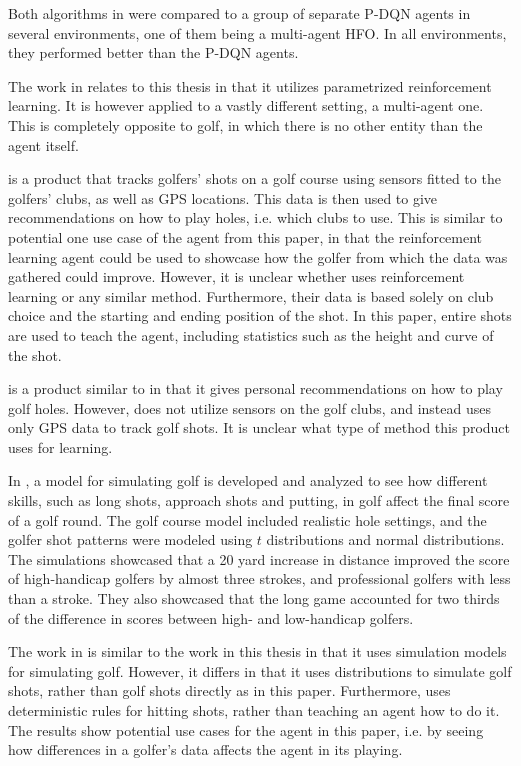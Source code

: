 \documentclass{kththesis}
\begin{document}
Both algorithms in \parencite{fu2019deep} were compared to a group of separate P-DQN agents in several environments, one of them being a multi-agent HFO. In all environments, they performed better than the P-DQN agents. 

The work in \parencite{fu2019deep} relates to this thesis in that it utilizes parametrized reinforcement learning. It is however applied to a vastly different setting, a multi-agent one. This is completely opposite to golf, in which there is no other entity than the agent itself.

\textcite{ArccosGo0:online} is a product that tracks golfers' shots on a golf course using sensors fitted to the golfers' clubs, as well as GPS locations. This data is then used to give recommendations on how to play holes, i.e. which clubs to use. This is similar to potential one use case of the agent from this paper, in that the reinforcement learning agent could be used to showcase how the golfer from which the data was gathered could improve. However, it is unclear whether \textcite{ArccosGo0:online} uses reinforcement learning or any similar method. Furthermore, their data is based solely on club choice and the starting and ending position of the shot. In this paper, entire shots are used to teach the agent, including statistics such as the height and curve of the shot.

\textcite{HelloBir63:online} is a product similar to \textcite{ArccosGo0:online} in that it gives personal recommendations on how to play golf holes. However, \textcite{HelloBir63:online} does not utilize sensors on the golf clubs, and instead uses only GPS data to track golf shots. It is unclear what type of method this product uses for learning.

In \parencite{ko2012simulation}, a model for simulating golf is developed and analyzed to see how different skills, such as long shots, approach shots and putting, in golf affect the final score of a golf round. The golf course model included realistic hole settings, and the golfer shot patterns were modeled using $t$ distributions and normal distributions. The simulations showcased that a 20 yard increase in distance improved the score of high-handicap golfers by almost three strokes, and professional golfers with less than a stroke. They also showcased that the long game accounted for two thirds of the difference in scores between high- and low-handicap golfers.

The work in \parencite{ko2012simulation} is similar to the work in this thesis in that it uses simulation models for simulating golf. However, it differs in that it uses distributions to simulate golf shots, rather than golf shots directly as in this paper. Furthermore, \parencite{ko2012simulation} uses deterministic rules for hitting shots, rather than teaching an agent how to do it. The results show potential use cases for the agent in this paper, i.e. by seeing how differences in a golfer's data affects the agent in its playing.
\end{document}
